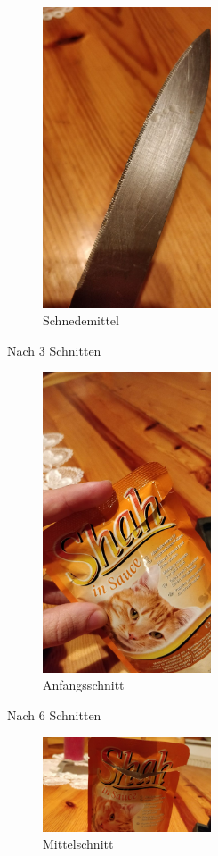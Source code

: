 \documentclass[a4paper,12pt]{scrartcl}
\begin{document}
\begin{figure}[H]
\begin{center}
\includegraphics[width=5cm]{Bilder/Schneideversuch_2.Art/Schneidemittel}
\caption{Schnedemittel}
\end{center}
\end{figure}

Nach 3 Schnitten

\begin{figure}[H]
\begin{center}
\includegraphics[width=5cm]{Bilder/Schneideversuch_2.Art/Anfangsschnitt}
\caption{Anfangsschnitt}
\end{center}
\end{figure}

Nach 6 Schnitten

\begin{figure}[H]
\begin{center}
\includegraphics[width=5cm]{Bilder/Schneideversuch_2.Art/Mittelschnitt}
\caption{Mittelschnitt}
\end{center}
\end{figure}
\end{document}
